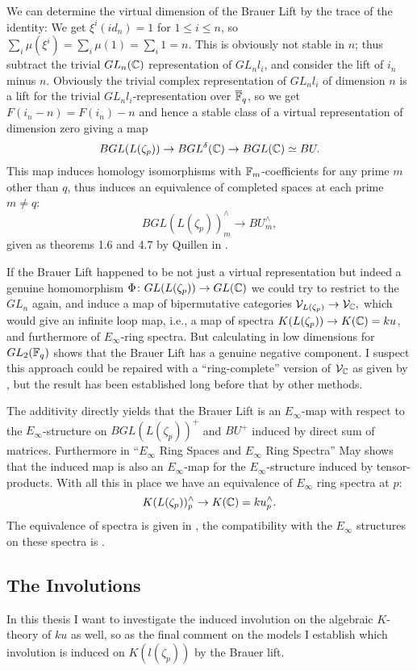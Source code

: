 We can determine the virtual dimension of the Brauer Lift by the 
trace of the identity: We get $\xi^i(id_n)=1$ for $1\leq i \leq n$, 
so $\sum_i\mu(\xi^i)=\sum_i\mu(1) = \sum_i1=n$.
This is obviously not stable in $n$; thus subtract the 
trivial $GL_n(\mathbb{C})$ representation of $GL_nl_i$,
and consider the lift of $i_n$ minus $n$. Obviously the 
trivial complex representation of $GL_nl_i$ of 
dimension $n$ is a lift for the trivial $GL_nl_i$-representation over
$\overline{\mathbb{F}}_q$, so we get $F(i_n-n)=F(i_n)-n$ and hence a stable class
of a virtual representation of dimension zero giving a map 
\[BGL(L(\zeta_p))\rightarrow BGL^\delta(\mathbb{C})\rightarrow BGL(\mathbb{C})\simeq BU.\]
This map induces homology isomorphisms with $\mathbb{F}_m$-coefficients for
any prime $m$ other than $q$, thus induces an equivalence of 
completed spaces at each prime $m\neq q$:
\[BGL(L(\zeta_p))^{\wedge}_m\rightarrow BU^{\wedge}_m,\]
given as theorems 1.6 and 4.7 by Quillen in \cite{Q1971}.

If the Brauer Lift happened to be not just a virtual representation
but indeed a genuine homomorphism $\Phi\colon GL(L(\zeta_p))
\rightarrow GL(\mathbb{C})$ we could try to restrict to the $GL_n$ again,
and induce a map of bipermutative categories
$\mathcal{V}_{L(\zeta_p)}\rightarrow \mathcal{V}_{\mathbb{C}},$ which would give an infinite loop
map, i.e., a map of spectra $K(L(\zeta_p))\rightarrow K(\mathbb{C})=ku$, and
furthermore of $E_\infty$-ring spectra. But calculating in low 
dimensions for $GL_2(\mathbb{F}_q)$ shows that the Brauer Lift has a genuine
negative component. I suspect this approach could be repaired
with a ``ring-complete'' version of $\mathcal{V}_{\mathbb{C}}$ as given by \cite{BDRR2013},
but the result has been established long before that by other methods.

The additivity directly yields that the Brauer Lift is an 
$E_\infty$-map with respect to the $E_\infty$-structure on 
$BGL(L(\zeta_p))^+$ and $BU^+$ induced by direct sum of matrices. 
Furthermore in ``$E_\infty$ Ring Spaces and $E_\infty$ Ring Spectra'' 
May shows \cite[pp. 212-222]{MayEinf} that the induced map is also an 
$E_\infty$-map for the $E_\infty$-structure induced by tensor-products. 
With all this in place we have an equivalence of 
$E_\infty$ ring spectra at $p$:
\[K(L(\zeta_p))^\wedge_p\rightarrow K(\mathbb{C})=ku^\wedge_p.\]
The equivalence of spectra is given in 
\cite[pp. 217+218, Corollary VIII.2.7, Theorem VIII.2.8]{MayEinf}, the compatibility
with the $E_\infty$ structures on these spectra is 
\cite[pp. 219-222, Theorem VIII.2.11]{MayEinf}. \label{einfapprox}

\subsection*{The Involutions}
In this thesis I want to investigate the induced involution on the 
algebraic $K$-theory of $ku$ as well, so as the final comment on the
models I establish which involution is induced on $K(l(\zeta_p))$ by
the Brauer lift.

